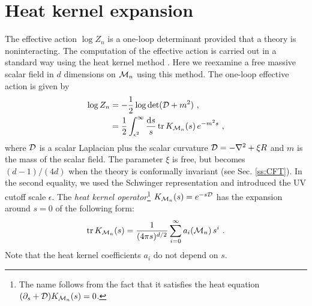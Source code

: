 \section{Heat kernel expansion}\label{ss:HeatKernel}
The effective action $\log Z_n$ is a one-loop determinant provided that a theory is noninteracting.
The computation of the effective action is carried out in a standard way using the heat kernel method \cite{Birrell:1982ix}.
Here we reexamine a free massive scalar field in $d$ dimensions on ${\cal M}_n$ using this method.
The one-loop effective action is given by
\begin{align}\label{MassiveScalar}
\begin{aligned}
\log Z_n &= - \frac{1}{2} \log \det ( {\cal D} + m^2) \ ,\\
	&= \frac{1}{2} \int_{\epsilon^2}^\infty \frac{\mathrm{d} s}{s}\,  {\rm tr} \,K_{{\cal M}_n}(s) \,e^{-m^2 s}\ ,
\end{aligned}
\end{align}
where ${\cal D}$ is a scalar Laplacian plus the scalar curvature ${\cal D} = -\nabla^2 + \xi R$ 
and $m$ is the mass of the scalar field. The parameter $\xi$ is free, but becomes $(d-1)/(4d)$ when the theory is conformally invariant (see Sec. \ref{ss:CFT}).
In the second equality, we used the Schwinger representation and introduced the UV cutoff scale $\epsilon$. 
The {\it heat kernel operator}\footnote{The name follows from the fact that it satisfies the heat equation $(\partial_s + {\cal D}) K_{{\cal M}_n} (s) = 0$.} $K_{{\cal M}_n}(s) = e^{-s {\cal D}}$ has the expansion around $s=0$ of the following form:
\begin{align}\label{HKE}
{\rm tr}\, K_{{\cal M}_n} (s) = \frac{1}{(4\pi s)^{d/2}} \sum_{i=0}^\infty a_i({\cal M}_n)\, s^i \ .
\end{align}
Note that the heat kernel coefficients $a_i$ do not depend on $s$.

